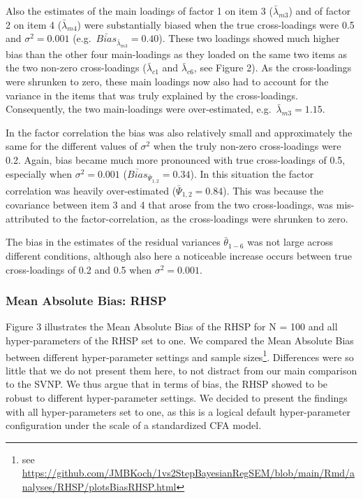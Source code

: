 \documentclass[
  man, donotrepeattitle,floatsintext]{apa6}
\begin{document}
Also the estimates of the main loadings of factor 1 on item 3 (\(\bar{\lambda}_{m 3}\)) and of factor 2 on item 4 (\(\bar{\lambda}_{m 4}\)) were substantially biased when the true cross-loadings were 0.5 and \(\sigma^2 = 0.001\) (e.g.~\(\bar{Bias}_{\bar{\lambda}_{m 3}} = 0.40\)). These two loadings showed much higher bias than the other four main-loadings as they loaded on the same two items as the two non-zero cross-loadings (\(\bar{\lambda}_{c 1}\) and \(\bar{\lambda}_{c 6}\), see Figure 2). As the cross-loadings were shrunken to zero, these main loadings now also had to account for the variance in the items that was truly explained by the cross-loadings. Consequently, the two main-loadings were over-estimated, e.g.~\(\bar{\lambda}_{m 3} = 1.15\).

In the factor correlation the bias was also relatively small and approximately the same for the different values of \(\sigma^2\) when the truly non-zero cross-loadings were 0.2. Again, bias became much more pronounced with true cross-loadings of 0.5, especially when \(\sigma^2 = 0.001\) (\(\bar{Bias}_{\bar{\Psi}_{1,2}} = 0.34\)). In this situation the factor correlation was heavily over-estimated (\(\bar{\Psi}_{1,2} = 0.84\)). This was because the covariance between item 3 and 4 that arose from the two cross-loadings, was mis-attributed to the factor-correlation, as the cross-loadings were shrunken to zero.

The bias in the estimates of the residual variances \(\bar{\theta}_{1-6}\) was not large across different conditions, although also here a noticeable increase occurs between true cross-loadings of 0.2 and 0.5 when \(\sigma^2 = 0.001\).

\hypertarget{mean-absolute-bias-rhsp}{%
\subsubsection{Mean Absolute Bias: RHSP}\label{mean-absolute-bias-rhsp}}

Figure 3 illustrates the Mean Absolute Bias of the RHSP for N = 100 and all hyper-parameters of the RHSP set to one. We compared the Mean Absolute Bias between different hyper-parameter settings and sample sizes\footnote{see \url{https://github.com/JMBKoch/1vs2StepBayesianRegSEM/blob/main/Rmd/analyses/RHSP/plotsBiasRHSP.html}}. Differences were so little that we do not present them here, to not distract from our main comparison to the SVNP. We thus argue that in terms of bias, the RHSP showed to be robust to different hyper-parameter settings. We decided to present the findings with all hyper-parameters set to one, as this is a logical default hyper-parameter configuration under the scale of a standardized CFA model.
\end{document}
